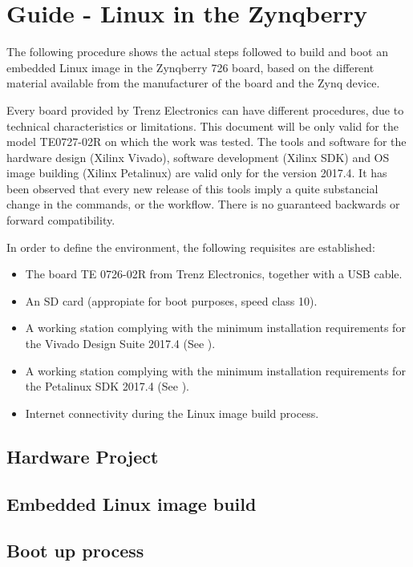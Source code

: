 

\chapter{Guide - Linux in the Zynqberry} \label{appen1}

The following procedure shows the actual steps followed to build and boot an embedded Linux image in the Zynqberry 726 board, based on the different material available from the manufacturer of the board and the Zynq device.

Every board provided by Trenz Electronics can have different procedures, due to technical characteristics or limitations. This document will be only valid for the model TE0727-02R on which the work was tested. The tools and software for the hardware design (Xilinx Vivado), software development (Xilinx SDK) and OS image building (Xilinx Petalinux) are valid only for the version 2017.4. It has been observed that every new release of this tools imply a quite substancial change in the commands, or the workflow. There is no guaranteed backwards or forward compatibility.

In order to define the environment, the following requisites are established:

\begin{itemize}
	\item The board TE 0726-02R from Trenz Electronics, together with a USB cable.
	\item An SD card (appropiate for boot purposes, speed class 10).
	\item A working station complying with the minimum installation requirements for the Vivado Design Suite 2017.4 (See \cite{UG973}).
	\item A working station complying with the minimum installation requirements for the Petalinux SDK 2017.4 (See \cite{UG1144}).
	\item Internet connectivity during the Linux image build process.
\end{itemize}

\section{Hardware Project}

\section{Embedded Linux image build}

\section{Boot up process}
